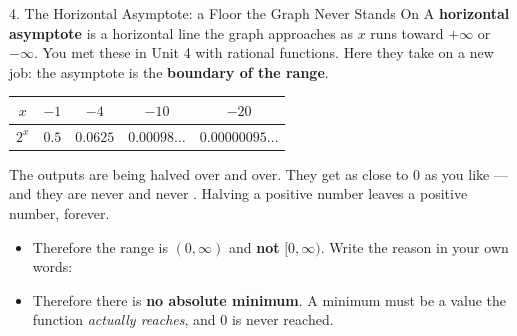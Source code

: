 \documentclass[10pt]{article}
\begin{document}
\begin{notesbox}{4. The Horizontal Asymptote: a Floor the Graph Never Stands On}
A \textbf{horizontal asymptote} is a horizontal line the graph approaches as $x$ runs toward
$+\infty$ or $-\infty$. You met these in Unit 4 with rational functions. Here they take on a new job:
the asymptote is the \textbf{boundary of the range}.
\begin{center}
\renewcommand{\arraystretch}{1.2}
\begin{tabular}{|c|c|c|c|c|}
\hline
$x$ & $-1$ & $-4$ & $-10$ & $-20$ \\ \hline
$2^{x}$ & $0.5$ & $0.0625$ & $0.00098\ldots$ & $0.00000095\ldots$ \\ \hline
\end{tabular}
\end{center}
The outputs are being halved over and over. They get as close to $0$ as you like --- and they are
never  and never . Halving a positive number leaves a positive number,
forever.
\begin{itemize}[leftmargin=1.5em, itemsep=3pt]
  \item Therefore the range is $(0,\infty)$ and \textbf{not} $[0,\infty)$. Write the reason in your
        own words: 
  \item Therefore there is \textbf{no absolute minimum}. A minimum must be a value the function
        \emph{actually reaches}, and $0$ is never reached.
\end{itemize}


\end{notesbox}
\end{document}
